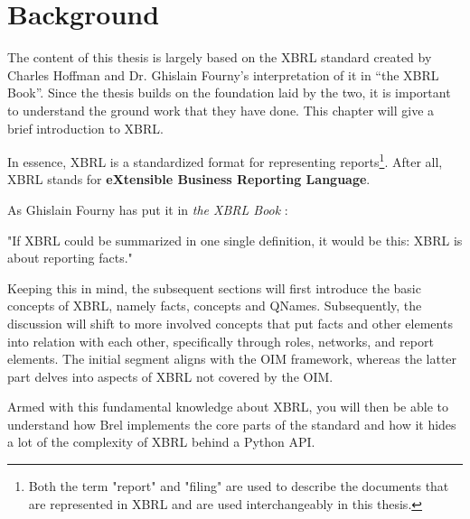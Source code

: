 \section{Background}

The content of this thesis is largely based on the XBRL standard\cite{xbrl} created by Charles Hoffman and Dr. Ghislain Fourny's interpretation of it in ``the XBRL Book''\cite{fourny2023xbrl}.
Since the thesis builds on the foundation laid by the two, it is important to understand the ground work that they have done.
This chapter will give a brief introduction to XBRL.

In essence, XBRL is a standardized format for representing reports\footnote{Both the term "report" and "filing" are used to describe the documents that are represented in XBRL and are used interchangeably in this thesis.}.
After all, XBRL stands for \textbf{eXtensible Business Reporting Language}.\cite{xbrl}

As Ghislain Fourny has put it in \textit{the XBRL Book} \cite{fourny2023xbrl}:
\begin{displayquote}
    "If XBRL could be summarized in one single definition, it would be this:
    XBRL is about reporting facts."
\end{displayquote}

Keeping this in mind, the subsequent sections will first introduce the basic concepts of XBRL, namely facts, concepts and QNames.
Subsequently, the discussion will shift to more involved concepts that put facts and other elements into relation with each other, 
specifically through roles, networks, and report elements.
The initial segment aligns with the OIM framework, whereas the latter part delves into aspects of XBRL not covered by the OIM.

Armed with this fundamental knowledge about XBRL, 
you will then be able to understand how Brel implements the core parts of the standard and how it hides a lot of the complexity of XBRL behind a Python API.

